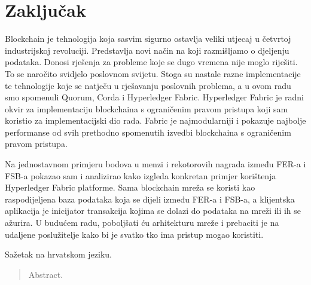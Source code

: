 \documentclass[times, utf8, diplomski]{fer}
\begin{document}

\chapter{Zaključak}
Blockchain je tehnologija koja sasvim sigurno ostavlja veliki utjecaj u četvrtoj industrijskoj revoluciji. Predstavlja novi način na koji razmišljamo o djeljenju podataka. Donosi rješenja za probleme koje se dugo vremena nije moglo riješiti. To se naročito svidjelo poslovnom svijetu. Stoga su nastale razne implementacije te tehnologije koje se natječu u rješavanju poslovnih problema, a u ovom radu smo spomenuli Quorum, Corda i Hyperledger Fabric. Hyperledger Fabric je radni okvir za implementaciju blockchaina s ograničenim pravom pristupa koji sam koristio za implementacijski dio rada. Fabric je najmodularniji i pokazuje najbolje performanse od svih prethodno spomenutih izvedbi blockchaina s ograničenim pravom pristupa.

Na jednostavnom primjeru bodova u menzi i rekotorovih nagrada između FER-a i FSB-a pokazao sam i analizirao kako izgleda konkretan primjer korištenja Hyperledger Fabric platforme. Sama blockchain mreža se koristi kao raspodijeljena baza podataka koja se dijeli između FER-a i FSB-a, a klijentska aplikacija je inicijator transakcija kojima se dolazi do podataka na mreži ili ih se ažurira. U budućem radu, poboljšati ću arhitekturu mreže i prebaciti je na udaljene poslužitelje kako bi je svatko tko ima pristup mogao koristiti.



\begin{sazetak}
Sažetak na hrvatskom jeziku.

\end{sazetak}

\begin{abstract}
Abstract.

\end{abstract}
\end{document}
